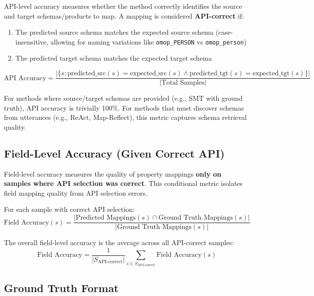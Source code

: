 \documentclass[sigconf, nonacm]{acmart}
\begin{document}
API-level accuracy measures whether the method correctly identifies the source and target schemas/products to map. A mapping is considered \textbf{API-correct} if:

\begin{enumerate}
    \item The predicted source schema matches the expected source schema (case-insensitive, allowing for naming variations like \texttt{omop\_PERSON} vs \texttt{omop\_person})
    \item The predicted target schema matches the expected target schema
\end{enumerate}

\begin{equation}
\text{API Accuracy} = \frac{|\{s : \text{predicted\_src}(s) = \text{expected\_src}(s) \land \text{predicted\_tgt}(s) = \text{expected\_tgt}(s)\}|}{|\text{Total Samples}|}
\end{equation}

For methods where source/target schemas are provided (e.g., SMT with ground truth), API accuracy is trivially 100\%. For methods that must discover schemas from utterances (e.g., ReAct, Map-Reflect), this metric captures schema retrieval quality.

\subsection{Field-Level Accuracy (Given Correct API)}

Field-level accuracy measures the quality of property mappings \textbf{only on samples where API selection was correct}. This conditional metric isolates field mapping quality from API selection errors.

For each sample with correct API selection:
\begin{equation}
\text{Field Accuracy}(s) = \frac{|\text{Predicted Mappings}(s) \cap \text{Ground Truth Mappings}(s)|}{|\text{Ground Truth Mappings}(s)|}
\end{equation}

The overall field-level accuracy is the average across all API-correct samples:
\begin{equation}
\text{Field Accuracy} = \frac{1}{|S_{\text{API-correct}}|} \sum_{s \in S_{\text{API-correct}}} \text{Field Accuracy}(s)
\end{equation}

\subsection{Ground Truth Format}
\end{document}
